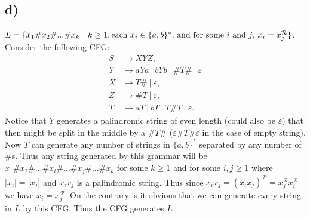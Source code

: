 \documentclass[a4paper,11pt]{article}
\newcommand{\abs}[1]{\left\lvert #1 \right\rvert}
\numberwithin{equation}{section}
\begin{document}
	\subsection*{d)}
	$ L=\{x_1\#x_2\#...\#x_k\ \vert\ k\geq1, \text{each $ x_i\in \{a,b\}^\ast $, and for some $ i $ and $ j $, $ x_i=x_j^\mathcal{R} $}\} $.\\
	Consider the following CFG:\begin{equation}
	\begin{aligned}
	S&\to XYZ,\\
	Y&\to aYa \ \vert\ bYb\ \vert\ \#T\#\ \vert\ \varepsilon\\
	X&\to T\#\ \vert\ \varepsilon,\\
	Z&\to \#T\ \vert\ \varepsilon,\\
	T&\to aT\ \vert\ bT\ \vert\ T\#T\ \vert\ \varepsilon.
	\end{aligned}
	\end{equation}
	Notice that $ Y $ generates a palindromic string of even length (could also be $ \varepsilon $) that then might be split in the middle by a $ \#T\# $ ($ \varepsilon\#T\#\varepsilon $ in the case of empty string). Now $ T $ can generate any number of strings in $ \{a,b\}^\ast $ separated by any number of $ \# $s. Thus any string generated by this grammar will be $ x_1\#x_2\#...\#x_i\#...\#x_j\#...\#x_k $ for some $ k\geq1 $ and for some $ i,j\geq1 $ where $ \abs{x_i}=\abs{x_j} $ and $ x_ix_j $ is a palindromic string. Thus since $ x_ix_j=(x_ix_j)^\mathcal{R}=x_j^\mathcal{R}x_i^\mathcal{R} $ we have $ x_i=x_j^\mathcal{R} $. On the contrary is it obvious that we can generate every string in $ L $ by this CFG. Thus the CFG generates $ L $.
	
\end{document}
